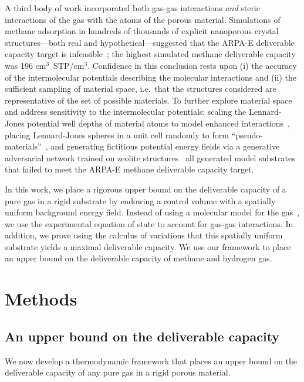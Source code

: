 \documentclass[twoside,twocolumn,9pt]{article}
\begin{document}
A third body of work incorporated both gas-gas interactions \emph{and} steric
interactions of the gas with the atoms of the porous material. Simulations of
methane adsorption in hundreds of thousands of explicit nanoporous crystal
structures---both real and hypothetical---suggested that the ARPA-E deliverable
capacity target is infeasible~\cite{simon2015materials}; the highest simulated
methane deliverable capacity was 196 cm$^3$~STP/cm$^3$. Confidence in this
conclusion rests upon (i) the accuracy of the intermolecular potentials
describing the molecular interactions and (ii) the sufficient sampling of
material space, i.e.\ that the structures considered are representative of the
set of possible materials. To further explore material space and address
sensitivity to the intermolecular potentials: scaling the Lennard-Jones
potential well depths of material atoms to model enhanced
interactions~\cite{gomez2014exploring}, placing Lennard-Jones spheres in a unit
cell randomly to form ``pseudo-materials''~\cite{kaija2018high}, and generating
fictitious potential energy fields via a generative adversarial network trained
on zeolite structures~\cite{lee2019predicting} all generated model substrates
that failed to meet the ARPA-E methane deliverable capacity target.


In this work, we place a rigorous upper bound on the deliverable capacity of a
pure gas in a rigid substrate by endowing a control volume with a spatially
uniform background energy field. Instead of using a molecular model for the
gas~\cite{gomez2017impact}, we use the experimental equation of state to
account for gas-gas interactions. In addition, we prove using the calculus of
variations that this spatially uniform substrate yields a maximal deliverable
capacity. We use our framework to place an upper bound on the deliverable
capacity of methane and hydrogen gas.

\section{Methods}
\subsection{An upper bound on the deliverable capacity}\label{sec:upper-bound}
We now develop a thermodynamic framework that places an upper bound on the deliverable capacity of any pure gas in a rigid porous material.
\end{document}
